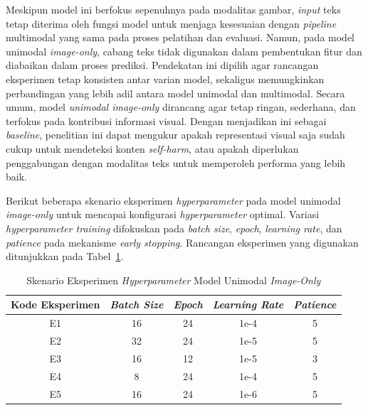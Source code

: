 Meskipun model ini berfokus sepenuhnya pada modalitas gambar, \textit{input} teks tetap diterima oleh fungsi model untuk menjaga kesesuaian dengan \textit{pipeline} multimodal yang sama pada proses pelatihan dan evaluasi. Namun, pada model unimodal \textit{image-only}, cabang teks tidak digunakan dalam pembentukan fitur dan diabaikan dalam proses prediksi. Pendekatan ini dipilih agar rancangan eksperimen tetap konsisten antar varian model, sekaligus memungkinkan perbandingan yang lebih adil antara model unimodal dan multimodal. Secara umum, model \textit{unimodal image-only} dirancang agar tetap ringan, sederhana, dan terfokus pada kontribusi informasi visual. Dengan menjadikan ini sebagai \textit{baseline}, penelitian ini dapat mengukur apakah representasi visual saja sudah cukup untuk mendeteksi konten \textit{self-harm}, atau apakah diperlukan penggabungan dengan modalitas teks untuk memperoleh performa yang lebih baik.

Berikut beberapa skenario eksperimen \textit{hyperparameter} pada model unimodal \textit{ image-only} untuk mencapai konfigurasi \textit{hyperparameter} optimal. Variasi \textit{hyperparameter training} difokuskan pada \textit{batch size}, \textit{epoch}, \textit{learning rate}, dan \textit{patience} pada mekanisme \textit{early stopping}. Rancangan eksperimen yang digunakan ditunjukkan pada Tabel~\ref{tabel:skenario_hyperparameter_unimodal_image_only}.

\begin{table}[H]
    \centering
    \caption{Skenario Eksperimen \textit{Hyperparameter} Model Unimodal \textit{ Image-Only}}
    \label{tabel:skenario_hyperparameter_unimodal_image_only}
    \small
    \setlength{\tabcolsep}{8pt}
    \renewcommand{\arraystretch}{1.1}
    \begin{tabular}{c c c c c}
        \hline
        \textbf{Kode Eksperimen} & \textbf{\textit{Batch Size}} & \textbf{\textit{Epoch}} & \textbf{\textit{Learning Rate}} & \textbf{\textit{Patience}} \\
        \hline
        E1 & 16 & 24 & 1e-4 & 5 \\
        E2 & 32 & 24 & 1e-5 & 5 \\
        E3 & 16 & 12 & 1e-5 & 3 \\
        E4 & 8 & 24 & 1e-4 & 5 \\
        E5 & 16 & 24 & 1e-6 & 5 \\
        \hline
    \end{tabular}
\end{table}

